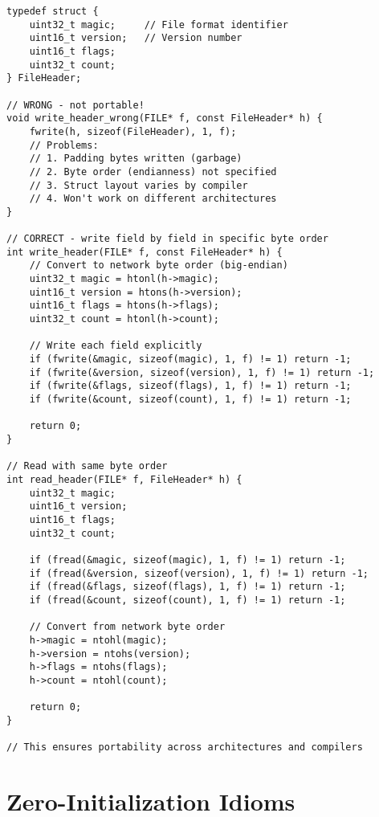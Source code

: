 \begin{lstlisting}
typedef struct {
    uint32_t magic;     // File format identifier
    uint16_t version;   // Version number
    uint16_t flags;
    uint32_t count;
} FileHeader;

// WRONG - not portable!
void write_header_wrong(FILE* f, const FileHeader* h) {
    fwrite(h, sizeof(FileHeader), 1, f);
    // Problems:
    // 1. Padding bytes written (garbage)
    // 2. Byte order (endianness) not specified
    // 3. Struct layout varies by compiler
    // 4. Won't work on different architectures
}

// CORRECT - write field by field in specific byte order
int write_header(FILE* f, const FileHeader* h) {
    // Convert to network byte order (big-endian)
    uint32_t magic = htonl(h->magic);
    uint16_t version = htons(h->version);
    uint16_t flags = htons(h->flags);
    uint32_t count = htonl(h->count);

    // Write each field explicitly
    if (fwrite(&magic, sizeof(magic), 1, f) != 1) return -1;
    if (fwrite(&version, sizeof(version), 1, f) != 1) return -1;
    if (fwrite(&flags, sizeof(flags), 1, f) != 1) return -1;
    if (fwrite(&count, sizeof(count), 1, f) != 1) return -1;

    return 0;
}

// Read with same byte order
int read_header(FILE* f, FileHeader* h) {
    uint32_t magic;
    uint16_t version;
    uint16_t flags;
    uint32_t count;

    if (fread(&magic, sizeof(magic), 1, f) != 1) return -1;
    if (fread(&version, sizeof(version), 1, f) != 1) return -1;
    if (fread(&flags, sizeof(flags), 1, f) != 1) return -1;
    if (fread(&count, sizeof(count), 1, f) != 1) return -1;

    // Convert from network byte order
    h->magic = ntohl(magic);
    h->version = ntohs(version);
    h->flags = ntohs(flags);
    h->count = ntohl(count);

    return 0;
}

// This ensures portability across architectures and compilers
\end{lstlisting}

\section{Zero-Initialization Idioms}

